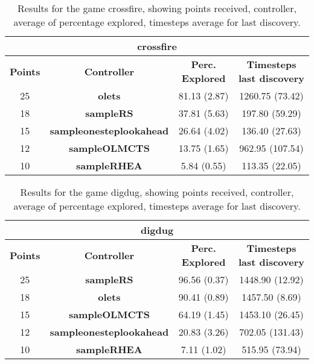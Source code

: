 \begin{table*}[!t]
\begin{center}
\begin{tabular}{|c|c|c|c|}
\multicolumn{4}{c}{\textbf{crossfire}}\\
\hline
\textbf{Points} & \textbf{Controller} & \textbf{Perc. Explored} &  \textbf{Timesteps last discovery}\\
\hline
25 & \textbf{olets} & 81.13 (2.87) & 1260.75 (73.42)
 \\
\hline
18 & \textbf{sampleRS} & 37.81 (5.63) & 197.80 (59.29)
 \\
\hline
15 & \textbf{sampleonesteplookahead} & 26.64 (4.02) & 136.40 (27.63)
 \\
\hline
12 & \textbf{sampleOLMCTS} & 13.75 (1.65) & 962.95 (107.54)
 \\
\hline
10 & \textbf{sampleRHEA} & 5.84 (0.55) & 113.35 (22.05)
 \\
\hline
\end{tabular}
\caption{Results for the game crossfire, showing points received, controller, average of percentage explored, timesteps average for last discovery.}
\label{tab:weights}
\end{center}
\end{table*}
\begin{table*}[!t]
\begin{center}
\begin{tabular}{|c|c|c|c|}
\multicolumn{4}{c}{\textbf{digdug}}\\
\hline
\textbf{Points} & \textbf{Controller} & \textbf{Perc. Explored} &  \textbf{Timesteps last discovery}\\
\hline
25 & \textbf{sampleRS} & 96.56 (0.37) & 1448.90 (12.92)
 \\
\hline
18 & \textbf{olets} & 90.41 (0.89) & 1457.50 (8.69)
 \\
\hline
15 & \textbf{sampleOLMCTS} & 64.19 (1.45) & 1453.10 (26.45)
 \\
\hline
12 & \textbf{sampleonesteplookahead} & 20.83 (3.26) & 702.05 (131.43)
 \\
\hline
10 & \textbf{sampleRHEA} & 7.11 (1.02) & 515.95 (73.94)
 \\
\hline
\end{tabular}
\caption{Results for the game digdug, showing points received, controller, average of percentage explored, timesteps average for last discovery.}
\label{tab:weights}
\end{center}
\end{table*}
